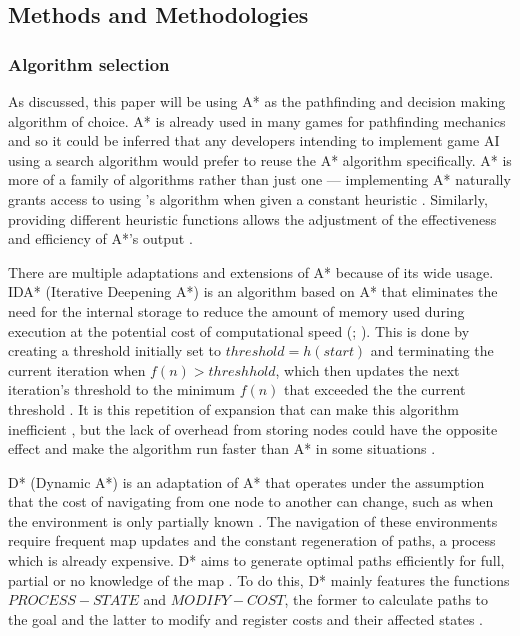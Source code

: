 \documentclass[11pt, a4paper]{article}
\begin{document}
\subsection{Methods and Methodologies}

\subsubsection{Algorithm selection}

As discussed, this paper will be using A* as the pathfinding and decision making algorithm of choice. A* is already used in many games for pathfinding mechanics \parencite[197]{millington2019ai} and so it could be inferred that any developers intending to implement game AI using a search algorithm would prefer to reuse the A* algorithm specifically. A* is more of a family of algorithms rather than just one \parencite[107]{hart1968formal} --- implementing A* naturally grants access to using \citeauthor{dijkstra1959note}'s algorithm \parencite*{dijkstra1959note} when given a constant heuristic \parencite[10]{lester2005pathfinding}. Similarly, providing different heuristic functions allows the adjustment of the effectiveness and efficiency of A*'s output \parencite[107]{hart1968formal}.

There are multiple adaptations and extensions of A* because of its wide usage. IDA* (Iterative Deepening A*) is an algorithm based on A* that eliminates the need for the internal storage \parencite[36]{korf1985depth} to reduce the amount of memory used during execution at the potential cost of computational speed (\cite[2]{botea2004near}; \cite[44]{yap2002grid}). This is done by creating a threshold initially set to $threshold = h(start)$ and terminating the current iteration when $f(n) > threshhold$, which then updates the next iteration's threshold to the minimum $f(n)$ that exceeded the the current threshold \parencite[103]{korf1985depth}. It is this repetition of expansion that can make this algorithm inefficient \parencite[46]{yap2002grid}, but the lack of overhead from storing nodes could have the opposite effect and make the algorithm run faster than A* in some situations \parencite[106]{korf1985depth}.

D* (Dynamic A*) is an adaptation of A* that operates under the assumption that the cost of navigating from one node to another can change, such as when the environment is only partially known \parencite[1-2]{stentz1997optimal}. The navigation of these environments require frequent map updates and the constant regeneration of paths, a process which is already expensive. D* aims to generate optimal paths efficiently for full, partial or no knowledge of the map \parencite[2]{stentz1997optimal}. To do this, D* mainly features the functions $PROCESS - STATE$ and $MODIFY - COST$, the former to calculate paths to the goal and the latter to modify and register costs and their affected states \parencite[3]{stentz1997optimal}.
\end{document}
